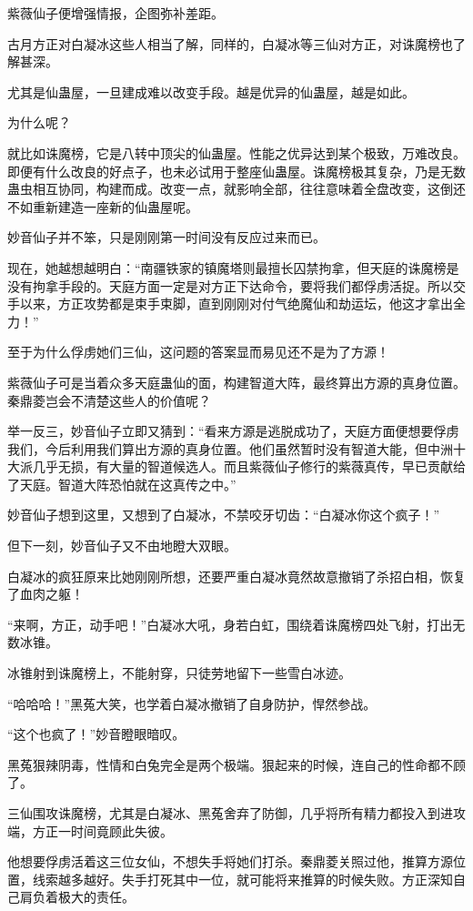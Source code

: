 \begin{this_body}
紫薇仙子便增强情报，企图弥补差距。

古月方正对白凝冰这些人相当了解，同样的，白凝冰等三仙对方正，对诛魔榜也了解甚深。

尤其是仙蛊屋，一旦建成难以改变手段。越是优异的仙蛊屋，越是如此。

为什么呢？

就比如诛魔榜，它是八转中顶尖的仙蛊屋。性能之优异达到某个极致，万难改良。即便有什么改良的好点子，也未必试用于整座仙蛊屋。诛魔榜极其复杂，乃是无数蛊虫相互协同，构建而成。改变一点，就影响全部，往往意味着全盘改变，这倒还不如重新建造一座新的仙蛊屋呢。

妙音仙子并不笨，只是刚刚第一时间没有反应过来而已。

现在，她越想越明白：“南疆铁家的镇魔塔则最擅长囚禁拘拿，但天庭的诛魔榜是没有拘拿手段的。天庭方面一定是对方正下达命令，要将我们都俘虏活捉。所以交手以来，方正攻势都是束手束脚，直到刚刚对付气绝魔仙和劫运坛，他这才拿出全力！”

至于为什么俘虏她们三仙，这问题的答案显而易见还不是为了方源！

紫薇仙子可是当着众多天庭蛊仙的面，构建智道大阵，最终算出方源的真身位置。秦鼎菱岂会不清楚这些人的价值呢？

举一反三，妙音仙子立即又猜到：“看来方源是逃脱成功了，天庭方面便想要俘虏我们，今后利用我们算出方源的真身位置。他们虽然暂时没有智道大能，但中洲十大派几乎无损，有大量的智道候选人。而且紫薇仙子修行的紫薇真传，早已贡献给了天庭。智道大阵恐怕就在这真传之中。”

妙音仙子想到这里，又想到了白凝冰，不禁咬牙切齿：“白凝冰你这个疯子！”

但下一刻，妙音仙子又不由地瞪大双眼。

白凝冰的疯狂原来比她刚刚所想，还要严重白凝冰竟然故意撤销了杀招白相，恢复了血肉之躯！

“来啊，方正，动手吧！”白凝冰大吼，身若白虹，围绕着诛魔榜四处飞射，打出无数冰锥。

冰锥射到诛魔榜上，不能射穿，只徒劳地留下一些雪白冰迹。

“哈哈哈！”黑菟大笑，也学着白凝冰撤销了自身防护，悍然参战。

“这个也疯了！”妙音瞪眼暗叹。

黑菟狠辣阴毒，性情和白兔完全是两个极端。狠起来的时候，连自己的性命都不顾了。

三仙围攻诛魔榜，尤其是白凝冰、黑菟舍弃了防御，几乎将所有精力都投入到进攻端，方正一时间竟顾此失彼。

他想要俘虏活着这三位女仙，不想失手将她们打杀。秦鼎菱关照过他，推算方源位置，线索越多越好。失手打死其中一位，就可能将来推算的时候失败。方正深知自己肩负着极大的责任。


\end{this_body}
